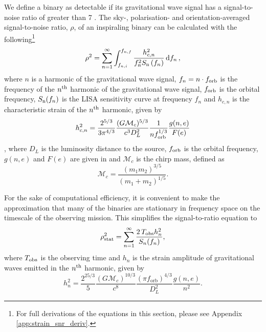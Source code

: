 \documentclass[twocolumn]{aastex63}
\begin{document}
We define a binary as detectable if its gravitational wave signal has a signal-to-noise ratio of greater than 7 \citep[e.g.][]{Breivik+2019, Korol+2020}. The sky-, polarisation- and orientation-averaged signal-to-noise ratio, $\rho$, of an inspiraling binary can be calculated with the following\footnote{For full derivations of the equations in this section, please see Appendix \ref{app:strain_snr_deriv}.} \citep[e.g.][]{Finn&Thorne2000}
\begin{equation}\label{eq:snr}
    \rho^2 = \sum_{n=1}^{\infty} \int_{f_{n, i}}^{f_{n, f}} \frac{h_{c, n}^{2}}{f_{n}^{2} S_{\rm n}\left(f_{n}\right)} \dd{f_n},
\end{equation}
where $n$ is a harmonic of the gravitational wave signal, $f_n = n \cdot f_{\rm orb}$ is the frequency of the $n^{\rm th}$ harmonic of the gravitational wave signal, $f_{\rm orb}$ is the orbital frequency, $S_{\rm n}(f_n)$ is the LISA sensitivity curve at frequency $f_n$ \citep[e.g.][]{Robson+2019} and $h_{c,n}$ is the characteristic strain of the $n^{\rm th}$ harmonic, given by
\begin{equation}\label{eq:charstrain}
    h^2_{c,n} = \frac{2^{5/3}}{3 \pi^{4/3}} \frac{(G \mathcal{M}_c)^{5/3}}{c^3 D_L^2} \frac{1}{n f_{\rm orb}^{1/3}} \frac{g(n,e)}{F(e)}
\end{equation}
\citep[e.g.][]{Barack&Cutler2004}, where $D_L$ is the luminosity distance to the source, $f_{\rm orb}$ is the orbital frequency, $g(n, e)$ and $F(e)$ are given in \citet{Peters1963} and $\mathcal{M}_c$ is the chirp mass, defined as
\begin{equation}\label{eq:chirp_mass}
    \mathcal{M}_c = \frac{(m_1 m_2)^{3/5}}{(m_1 + m_2)^{1/5}}.
\end{equation}

For the sake of computational efficiency, it is convenient to make the approximation that many of the binaries are stationary in frequency space on the timescale of the observing mission. This simplifies the signal-to-ratio equation to
\begin{equation}\label{eq:snr_stat}
    \rho_{\rm stat}^2 = \sum_{n=1}^{\infty} \frac{2 \, T_{\rm obs} h_n^2}{S_n(f_n)},
\end{equation}
where $T_{\rm obs}$ is the observing time and $h_n$ is the strain amplitude of gravitational waves emitted in the $n^{\rm th}$ harmonic, given by
\begin{equation}
    h_n^2 = \frac{2^{25/3}}{5} \frac{\left(G \mathcal{M}_{c}\right)^{10/3}}{c^{8}} \frac{\left(\pi f_{\mathrm{orb}}\right)^{4 / 3}}{D_L^2} \frac{g(n, e)}{n^2}.
\end{equation}
\end{document}
